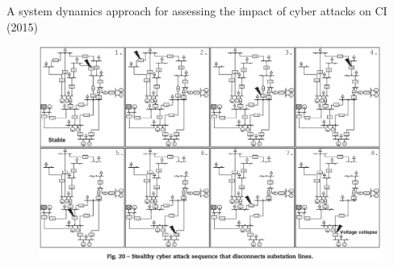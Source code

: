 \documentclass[compress]{beamer}
\begin{document}
\begin{frame}{A system dynamics approach for assessing the impact of cyber attacks on CI (2015)}
    \begin{figure}
    \centering
    \includegraphics[width=1.0\textwidth]{./images/stealthy-attack-sequence.png}
    \label{fig:stealthy-attack-sequence}
    \end{figure}
\end{frame}
\end{document}
